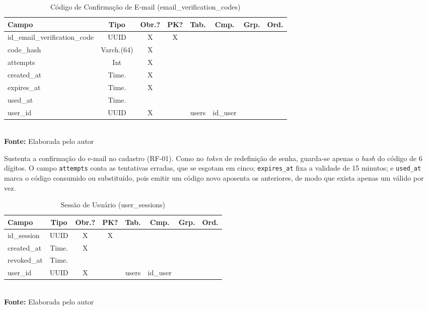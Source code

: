 \FloatBarrier
\begin{table}[!htbp]
\centering
\caption{Código de Confirmação de E-mail (email\_verification\_codes)}
\footnotesize
\begin{tabularx}{\textwidth}{ | X | c | c | c | c | c | c | c | }
    \hline
    \textbf{Campo} & \textbf{Tipo} & \textbf{Obr.?} & \textbf{PK?} & \textbf{Tab.} & \textbf{Cmp.} & \textbf{Grp.} & \textbf{Ord.}\\ \hline
    id\_email\_verification\_code & UUID & X & X &  &  &  &  \\ \hline
    code\_hash & Varch.(64) & X &  &  &  &  &  \\ \hline
    attempts & Int & X &  &  &  &  &  \\ \hline
    created\_at & Time. & X &  &  &  &  &  \\ \hline
    expires\_at & Time. & X &  &  &  &  &  \\ \hline
    used\_at & Time. &  &  &  &  &  &  \\ \hline
    user\_id & UUID & X &  & users & id\_user &  &  \\ \hline
\end{tabularx}
\vspace{0.1cm} \\ \textbf{Fonte:} Elaborada pelo autor
\label{tab:tabelaEmailVerificationCodeDetalhado}
\end{table}

Sustenta a confirmação do e-mail no cadastro (RF-01). Como no \textit{token} de redefinição de senha, guarda-se apenas o \textit{hash} do código de 6 dígitos. O campo \texttt{attempts} conta as tentativas erradas, que se esgotam em cinco; \texttt{expires\_at} fixa a validade de 15 minutos; e \texttt{used\_at} marca o código consumido ou substituído, pois emitir um código novo aposenta os anteriores, de modo que exista apenas um válido por vez.

\FloatBarrier
\begin{table}[!htbp]
\centering
\caption{Sessão de Usuário (user\_sessions)}
\footnotesize
\begin{tabularx}{\textwidth}{ | X | c | c | c | c | c | c | c | }
    \hline
    \textbf{Campo} & \textbf{Tipo} & \textbf{Obr.?} & \textbf{PK?} & \textbf{Tab.} & \textbf{Cmp.} & \textbf{Grp.} & \textbf{Ord.}\\ \hline
    id\_session & UUID & X & X &  &  &  &  \\ \hline
    created\_at & Time. & X &  &  &  &  &  \\ \hline
    revoked\_at & Time. &  &  &  &  &  &  \\ \hline
    user\_id & UUID & X &  & users & id\_user &  &  \\ \hline
\end{tabularx}
\vspace{0.1cm} \\ \textbf{Fonte:} Elaborada pelo autor
\label{tab:tabelaUserSessionDetalhado}
\end{table}

